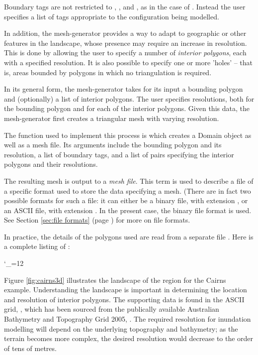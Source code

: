 \documentclass{manual}
\newcommand{\verbatiminputB}[1]{%
\endgroup}
\def\verbatiminputunderscore{\begingroup 
\catcode`\_=12
\verbatiminputB}
\begin{document}
Boundary tags are not restricted to , ,
 and , as in the case of
. Instead the user specifies a list of
tags appropriate to the configuration being modelled.

In addition, the mesh-generator provides a way to adapt to geographic or
other features in the landscape, whose presence may require an
increase in resolution. This is done by allowing the user to specify
a number of \emph{interior polygons}, each with a specified
resolution. It is also
possible to specify one or more 'holes' -- that is, areas bounded by
polygons in which no triangulation is required.

In its general form, the mesh-generator takes for its input a bounding
polygon and (optionally) a list of interior polygons. The user
specifies resolutions, both for the bounding polygon and for each of
the interior polygons. Given this data, the mesh-generator first creates a
triangular mesh with varying resolution.

The function used to implement this process is
 which creates a Domain object as
well as a mesh file.  Its arguments include the
bounding polygon and its resolution, a list of boundary tags, and a
list of pairs  specifying the interior
polygons and their resolutions.

The resulting mesh is output to a \emph{mesh file}\label{def:mesh file}. This term is used to describe a file of
a specific format used to store the data specifying a mesh. (There
are in fact two possible formats for such a file: it can either be a
binary file, with extension , or an ASCII file, with
extension . In the present case, the binary file format
 is used. See Section \ref{sec:file formats} (page
\pageref{sec:file formats}) for more on file formats.

In practice, the details of the polygons used are read from a
separate file . Here is a complete listing of
:

\verbatiminputunderscore{../../anuga_core/examples/cairns/project.py}

Figure \ref{fig:cairns3d} illustrates the landscape of the region
for the Cairns example. Understanding the landscape is important in
determining the location and resolution of interior polygons. The
supporting data is found in the ASCII grid, , which
has been sourced from the publically available Australian Bathymetry
and Topography Grid 2005, \cite{grid250}. The required resolution
for inundation modelling will depend on the underlying topography and
bathymetry; as the terrain becomes more complex, the desired resolution
would decrease to the order of tens of metres.
\end{document}
